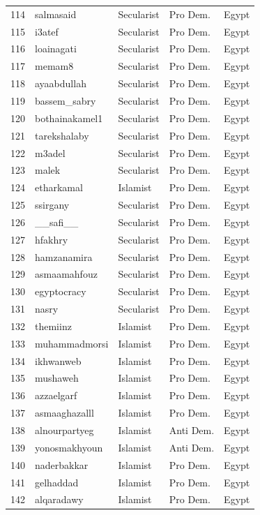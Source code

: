 \documentclass[12pt]{article}
\begin{document}
\begin{longtable}{rllll}
	114 & salmasaid & Secularist & Pro Dem. & Egypt \\ 
	115 & i3atef & Secularist & Pro Dem. & Egypt \\ 
	116 & loainagati & Secularist & Pro Dem. & Egypt \\ 
	117 & memam8 & Secularist & Pro Dem. & Egypt \\ 
	118 & ayaabdullah & Secularist & Pro Dem. & Egypt \\ 
	119 & bassem\_sabry & Secularist & Pro Dem. & Egypt \\ 
	120 & bothainakamel1 & Secularist & Pro Dem. & Egypt \\ 
	121 & tarekshalaby & Secularist & Pro Dem. & Egypt \\ 
	122 & m3adel & Secularist & Pro Dem. & Egypt \\ 
	123 & malek & Secularist & Pro Dem. & Egypt \\ 
	124 & etharkamal & Islamist & Pro Dem. & Egypt \\ 
	125 & ssirgany & Secularist & Pro Dem. & Egypt \\ 
	126 & \_\_safi\_\_ & Secularist & Pro Dem. & Egypt \\ 
	127 & hfakhry & Secularist & Pro Dem. & Egypt \\ 
	128 & hamzanamira & Secularist & Pro Dem. & Egypt \\ 
	129 & asmaamahfouz & Secularist & Pro Dem. & Egypt \\ 
	130 & egyptocracy & Secularist & Pro Dem. & Egypt \\ 
	131 & nasry & Secularist & Pro Dem. & Egypt \\ 
	132 & themiinz & Islamist & Pro Dem. & Egypt \\ 
	133 & muhammadmorsi & Islamist & Pro Dem. & Egypt \\ 
	134 & ikhwanweb & Islamist & Pro Dem. & Egypt \\ 
	135 & mushaweh & Islamist & Pro Dem. & Egypt \\ 
	136 & azzaelgarf & Islamist & Pro Dem. & Egypt \\ 
	137 & asmaaghazalll & Islamist & Pro Dem. & Egypt \\ 
	138 & alnourpartyeg & Islamist & Anti Dem. & Egypt \\ 
	139 & yonosmakhyoun & Islamist & Anti Dem. & Egypt \\ 
	140 & naderbakkar & Islamist & Pro Dem. & Egypt \\ 
	141 & gelhaddad & Islamist & Pro Dem. & Egypt \\ 
	142 & alqaradawy & Islamist & Pro Dem. & Egypt \\ 
	\hline
	\hline
\end{longtable}

\printbibliography
\end{document}
